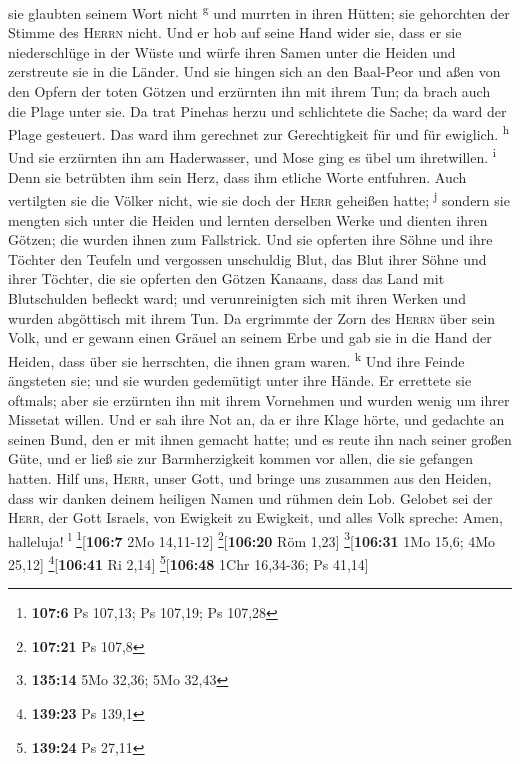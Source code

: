 sie glaubten seinem Wort nicht \textsuperscript{g}  und
murrten in ihren Hütten; sie gehorchten der Stimme des \textsc{Herrn}
nicht.  Und er hob auf seine Hand wider sie, dass er sie
niederschlüge in der Wüste  und würfe ihren Samen unter
die Heiden und zerstreute sie in die Länder.  Und sie
hingen sich an den Baal-Peor und aßen von den Opfern der toten Götzen
 und erzürnten ihn mit ihrem Tun; da brach auch die Plage
unter sie.  Da trat Pinehas herzu und schlichtete die
Sache; da ward der Plage gesteuert.  Das ward ihm
gerechnet zur Gerechtigkeit für und für ewiglich. \textsuperscript{h}
 Und sie erzürnten ihn am Haderwasser, und Mose ging es
übel um ihretwillen. \textsuperscript{i}  Denn sie
betrübten ihm sein Herz, dass ihm etliche Worte entfuhren.
 Auch vertilgten sie die Völker nicht, wie sie doch der
\textsc{Herr} geheißen hatte; \textsuperscript{j} 
sondern sie mengten sich unter die Heiden und lernten derselben Werke
 und dienten ihren Götzen; die wurden ihnen zum
Fallstrick.  Und sie opferten ihre Söhne und ihre Töchter
den Teufeln  und vergossen unschuldig Blut, das Blut
ihrer Söhne und ihrer Töchter, die sie opferten den Götzen Kanaans, dass
das Land mit Blutschulden befleckt ward;  und
verunreinigten sich mit ihren Werken und wurden abgöttisch mit ihrem
Tun.  Da ergrimmte der Zorn des \textsc{Herrn} über sein
Volk, und er gewann einen Gräuel an seinem Erbe  und gab
sie in die Hand der Heiden, dass über sie herrschten, die ihnen gram
waren. \textsuperscript{k}  Und ihre Feinde ängsteten
sie; und sie wurden gedemütigt unter ihre Hände.  Er
errettete sie oftmals; aber sie erzürnten ihn mit ihrem Vornehmen und
wurden wenig um ihrer Missetat willen.  Und er sah ihre
Not an, da er ihre Klage hörte,  und gedachte an seinen
Bund, den er mit ihnen gemacht hatte; und es reute ihn nach seiner
großen Güte,  und er ließ sie zur Barmherzigkeit kommen
vor allen, die sie gefangen hatten.  Hilf uns,
\textsc{Herr}, unser Gott, und bringe uns zusammen aus den Heiden, dass
wir danken deinem heiligen Namen und rühmen dein Lob. 
Gelobet sei der \textsc{Herr}, der Gott Israels, von Ewigkeit zu
Ewigkeit, und alles Volk spreche: Amen, halleluja! \textsuperscript{l}
\footnote{\textbf{107:6} Ps 107,13; Ps 107,19; Ps 107,28}{[}\textbf{106:7}
2Mo 14,11-12{]} \footnote{\textbf{107:21} Ps 107,8}{[}\textbf{106:20}
Röm 1,23{]} \footnote{\textbf{135:14} 5Mo 32,36; 5Mo 32,43}{[}\textbf{106:31}
1Mo 15,6; 4Mo 25,12{]} \footnote{\textbf{139:23} Ps 139,1}{[}\textbf{106:41}
Ri 2,14{]} \footnote{\textbf{139:24} Ps 27,11}{[}\textbf{106:48} 1Chr
16,34-36; Ps 41,14{]}

